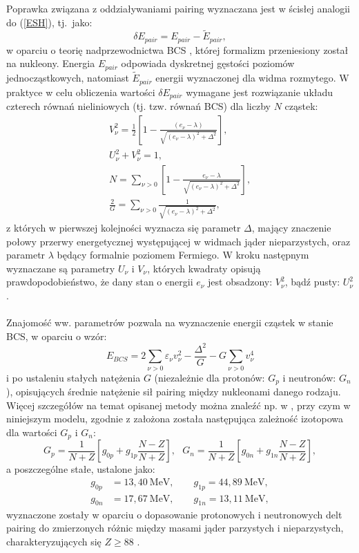 \documentclass[a4paper,polish,twoside]{article}
\numberwithin{equation}{section}
\begin{document}
Poprawka związana z oddziaływaniami pairing wyznaczana jest w ścisłej analogii do (\ref{ESH}), tj.~jako:
\begin{equation}
\delta E_{pair}=E_{pair}-\widetilde{E}_{pair},
\end{equation}
w oparciu o teorię nadprzewodnictwa BCS \cite{BCS}, której formalizm przeniesiony został na nukleony. Energia $E_{pair}$ odpowiada dyskretnej gęstości poziomów jednocząstkowych, natomiast $\widetilde{E}_{pair}$ energii wyznaczonej dla widma rozmytego. W praktyce w celu obliczenia wartości $\delta E_{pair}$ wymagane jest rozwiązanie układu czterech równań nieliniowych (tj. tzw. równań BCS) dla liczby $N$ cząstek:
\begin{gather*}
V_{\nu}^2=\frac{1}{2}\left[ 1-  \frac{(e_{\nu}-\lambda)}{\sqrt{\left(e_{\nu}-\lambda\right)^2+\Delta^2}} \right], \\
U_{\nu}^2+ V_{\nu}^2 =1, \\
N = \sum_{\nu>0} \left[1- \frac{e_{\nu}-\lambda}{\sqrt{\left(e_{\nu}-\lambda\right)^2+\Delta^2}} \right], \\
\frac{2}{G} = \sum_{\nu>0} \frac{1}{\sqrt{\left(e_{\nu}-\lambda\right)^2+\Delta^2}},
\end{gather*}
z których w pierwszej kolejności wyznacza się parametr $\Delta$, mający znaczenie połowy przerwy energetycznej występującej w widmach jąder nieparzystych, oraz parametr $\lambda$ będący formalnie poziomem Fermiego. W kroku następnym wyznaczane są parametry $U_{\nu}$ i $V_{\nu}$, których kwadraty opisują prawdopodobieństwo, że dany stan o energii $e_{\nu}$ jest obsadzony: $V_{\nu}^2$, bądź pusty: $U_{\nu}^2$.\\ \\
Znajomość ww. parametrów pozwala na wyznaczenie energii cząstek w stanie BCS, w oparciu o wzór: 
\begin{equation}
E_{BCS}=2\sum_{\nu>0}^{}\varepsilon_{\nu}v^{2}_{\nu}-\frac{\Delta^{2}}{G}-G\sum_{\nu>0}^{}v^{4}_{\nu}
\end{equation}
i po ustaleniu stałych natężenia $G$ (niezależnie dla protonów: $G_p$ i neutronów: $G_n$), opisujących średnie natężenie sił pairing między nukleonami danego rodzaju. Więcej szczegółów na temat opisanej metody można znaleźć np. w \cite{Pomorski}, przy czym w niniejszym modelu, zgodnie z \cite{G} założona została następująca zależność izotopowa dla wartości $G_p$ i $G_n$:
\begin{equation}
G_p=\frac{1}{N+Z} \left [ g_{0p} + g_{1p} \frac{N-Z}{N+Z} \right ],  ~~~G_n=\frac{1}{N+Z} \left [ g_{0n} + g_{1n} \frac{N-Z}{N+Z} \right ],
\end{equation}
a poszczególne stałe, ustalone jako:
\begin{align*}
g_{0p}&=13,40~\mathrm{MeV}, \qquad g_{1p}=44,89~\mathrm{MeV}, \\
g_{0n}&=17,67~\mathrm{MeV}, \qquad g_{1n}=13,11~\mathrm{MeV},
\end{align*}
wyznaczone zostały w oparciu o dopasowanie protonowych i neutronowych delt pairing do zmierzonych różnic między masami jąder parzystych i nieparzystych, charakteryzujących się $Z \ge 88$ \cite{Muntian}.
\end{document}
